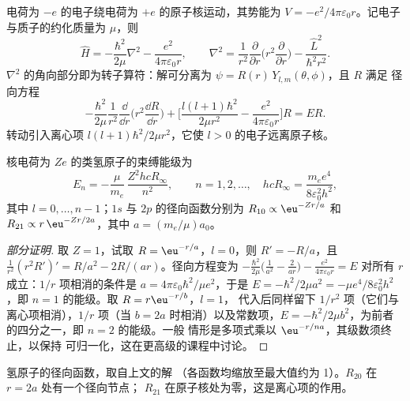 电荷为 $-e$ 的电子绕电荷为 $+e$ 的原子核运动，其势能为 $V = -e^2/
4\pi\varepsilon_0r$。记电子与质子的约化质量为 $\mu$，则
\[
\hat H = -\frac{\hbar^2}{2\mu}\nabla^2 - \frac{e^2}{4\pi\varepsilon_0r},\qquad
\nabla^2 = \frac{1}{r^2}\frac{\partial}{\partial r}\Big(r^2\frac{\partial}{
\partial r}\Big) - \frac{\hat L^2}{\hbar^2r^2}.
\]
$\nabla^2$ 的角向部分即为转子算符：解可分离为
$\psi = R(r)\,Y_{l,m}(\theta,\phi)$，且 $R$ 满足
径向方程
\[
-\frac{\hbar^2}{2\mu}\frac{1}{r^2}\frac{\dd}{\dd r}\Big(r^2\frac{\dd R}{\dd r}
\Big) + \Big[\frac{l(l+1)\hbar^2}{2\mu r^2} - \frac{e^2}{4\pi\varepsilon_0r}
\Big]R = ER.
\]
转动引入离心项 $l(l+1)\hbar^2/2\mu r^2$，它使
$l > 0$ 的电子远离原子核。

\begin{theorem}[氢原子的能级]\label{thm:b3:quantum-model-systems:hydrogen}
核电荷为 $Ze$ 的类氢原子的束缚能级为
\[
E_n = -\frac{\mu}{m_e}\,\frac{Z^2hcR_\infty}{n^2}, \qquad n = 1, 2, \dots,
\quad hcR_\infty = \frac{m_ee^4}{8\varepsilon_0^2h^2},
\]
其中 $l = 0, \dots, n - 1$；$1s$ 与 $2p$ 的径向函数分别为 $R_{10}
\propto \eu^{-Zr/a}$ 和 $R_{21} \propto r\,\eu^{-Zr/2a}$，其中 $a =
(m_e/\mu)a_0$。
\end{theorem}

\begin{proof}[部分证明]
取 $Z = 1$，试取 $R = \eu^{-r/a}$，$l = 0$，则 $R' = -R/a$，且
$\frac{1}{r^2}(r^2R')' = R/a^2 - 2R/(ar)$。径向方程变为
$-\frac{\hbar^2}{2\mu}\big(\frac{1}{a^2} - \frac{2}{ar}\big) - \frac{e^2}{4\pi
\varepsilon_0r} = E$ 对所有 $r$ 成立：$1/r$ 项相消的条件是 $a =
4\pi\varepsilon_0\hbar^2/\mu e^2$，于是 $E = -\hbar^2/2\mu a^2 = -\mu
e^4/8\varepsilon_0^2h^2$，即 $n = 1$ 的能级。取 $R = r\eu^{-r/b}$，$l = 1$，
代入后同样留下 $1/r^2$ 项（它们与
离心项相消），$1/r$ 项（当 $b = 2a$ 时相消）以及常数项，$E =
-\hbar^2/2\mu b^2$，为前者的四分之一，即 $n = 2$ 的能级。一般
情形是多项式乘以 $\eu^{-r/na}$，其级数须终止，以保持
可归一化，这在更高级的课程中讨论。
\end{proof}

\begin{omfigure}

{\small 氢原子的径向函数，取自上文的解
（各函数均缩放至最大值约为 1）。$R_{20}$ 在 $r = 2a$ 处有一个径向节点；
$R_{21}$ 在原子核处为零，这是离心项的作用。}
\end{omfigure}

